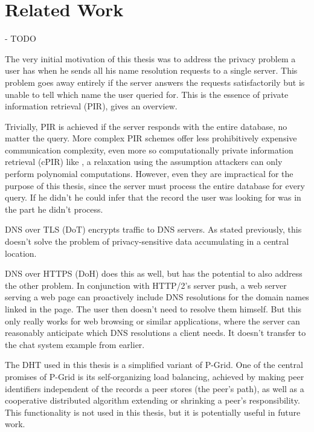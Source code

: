 \chapter{Related Work}
\label{chap:related_work}
- TODO

The very initial motivation of this thesis was to address the privacy problem a
user has when he sends all his name resolution requests to a single server. This
problem goes away entirely if the server answers the requests satisfactorily but
is unable to tell which name the user queried for. This is the essence of
private information retrieval (PIR), \cite{gasarch2004survey} gives an overview.

Trivially, PIR is achieved if the server responds with the entire database, no
matter the query. More complex PIR schemes offer less prohibitively expensive
communication complexity, even more so computationally private information
retrieval (cPIR) like \cite{cachin1999computationally}, a relaxation using the
assumption attackers can only perform polynomial computations. However, even
they are impractical for the purpose of this thesis, since the server must
process the entire database for every query. If he didn't he could infer that
the record the user was looking for was in the part he didn't process.

DNS over TLS (DoT)\cite{RFC7858} encrypts traffic to DNS servers. As stated
previously, this doesn't solve the problem of privacy-sensitive data
accumulating in a central location.

DNS over HTTPS (DoH)\cite{RFC8484} does this as well, but has the potential to
also address the other problem. In conjunction with HTTP/2's server
push\cite{RFC7540}, a web server serving a web page can proactively include DNS
resolutions for the domain names linked in the page. The user then doesn't need
to resolve them himself. But this only really works for web browsing or similar
applications, where the server can reasonably anticipate which DNS resolutions a
client needs. It doesn't transfer to the chat system example from earlier.

The \ac{DHT} used in this thesis is a simplified variant of
P-Grid\cite{aberer2001pgrid}. One of the central promises of P-Grid is its
self-organizing load balancing, achieved by making peer identifiers independent
of the records a peer stores (the peer's path), as well as a cooperative
distributed algorithm extending or shrinking a peer's responsibility. This
functionality is not used in this thesis, but it is potentially useful in future
work.

